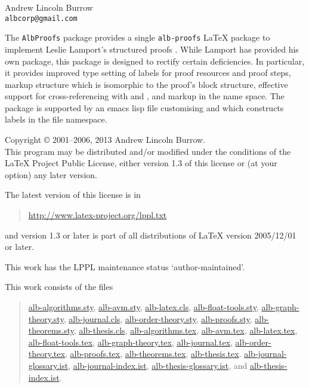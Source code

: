 \documentclass[11pt,a4paper,oneside,titlepage]{alb-latex}
\begin{document}



\begin{albTitlePage}


  Andrew Lincoln Burrow\\
  \texttt{albcorp@gmail.com}



  The \texttt{AlbProofs} package provides a single \texttt{alb-proofs}
  \LaTeX{} package to implement Leslie Lamport's structured proofs
  \citep{lamport93:_how_write_proof}.  While Lamport has provided his
  own package, this package is designed to rectify certain deficiencies.
  In particular, it provides improved type setting of labels for proof
  resources and proof steps, markup structure which is isomorphic to the
  proof's block structure, effective support for cross-referencing with
  \AUCTeX{} and \RefTeX{}, and markup in the \albLogo{} name space.  The
  package is supported by an emacs lisp file customising \AUCTeX{} and
  \RefTeX{} which constructs labels in the file namespace.



  Copyright \copyright{} 2001--2006, 2013 Andrew Lincoln Burrow.\\
  This program may be distributed and/or modified under the conditions
  of the \LaTeX{} Project Public License, either version 1.3 of this
  license or (at your option) any later version.

  \medskip{}

  The latest version of this license is in
  \begin{quote}
    \url{http://www.latex-project.org/lppl.txt}
  \end{quote}
  and version 1.3 or later is part of all distributions of LaTeX version
  2005/12/01 or later.

  \medskip{}

  This work has the LPPL maintenance status `author-maintained'.

  \medskip{}

  This work consists of the files
  \begin{quote}
    \begin{flushleft}
      \url{alb-algorithms.sty}, \url{alb-avm.sty}, \url{alb-latex.cls},
      \url{alb-float-tools.sty}, \url{alb-graph-theory.sty},
      \url{alb-journal.cls}, \url{alb-order-theory.sty},
      \url{alb-proofs.sty}, \url{alb-theorems.sty},
      \url{alb-thesis.cls}, \url{alb-algorithms.tex}, \url{alb-avm.tex},
      \url{alb-latex.tex}, \url{alb-float-tools.tex},
      \url{alb-graph-theory.tex}, \url{alb-journal.tex},
      \url{alb-order-theory.tex}, \url{alb-proofs.tex},
      \url{alb-theorems.tex}, \url{alb-thesis.tex}.
      \url{alb-journal-glossary.ist}, \url{alb-journal-index.ist},
      \url{alb-thesis-glossary.ist}, and \url{alb-thesis-index.ist}.
    \end{flushleft}
  \end{quote}



\end{albTitlePage}
\end{document}
